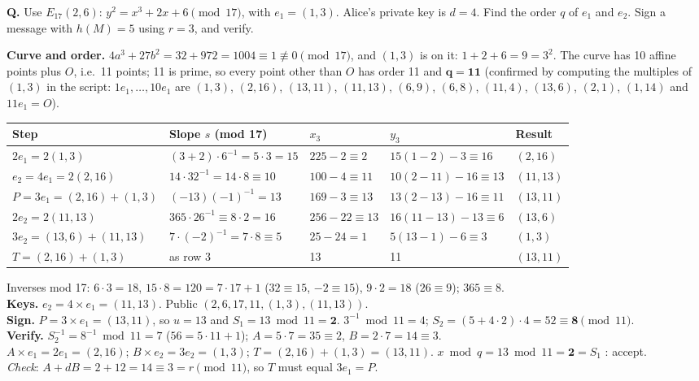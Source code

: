 \begin{worked}
\textbf{Q.} Use $E_{17}(2, 6)$: $y^2 = x^3 + 2x + 6 \pmod{17}$, with $e_1 = (1, 3)$. Alice's private key is $d = 4$. Find the order $q$ of $e_1$ and $e_2$. Sign a message with $h(M) = 5$ using $r = 3$, and verify.

\textbf{Curve and order.} $4a^3 + 27b^2 = 32 + 972 = 1004 \equiv 1 \not\equiv 0 \pmod{17}$, and $(1, 3)$ is on it: $1 + 2 + 6 = 9 = 3^2$. The curve has 10 affine points plus $O$, i.e.\ 11 points; 11 is prime, so every point other than $O$ has order 11 and $\mathbf{q = 11}$ (confirmed by computing the multiples of $(1, 3)$ in the script: $1e_1, \dots, 10e_1$ are $(1,3)$, $(2,16)$, $(13,11)$, $(11,13)$, $(6,9)$, $(6,8)$, $(11,4)$, $(13,6)$, $(2,1)$, $(1,14)$ and $11e_1 = O$).
\begin{center}\small
\begin{tabular}{@{}lllll@{}}
\toprule
Step & Slope $s$ (mod 17) & $x_3$ & $y_3$ & Result\\
\midrule
$2e_1 = 2(1, 3)$ & $(3 + 2)\cdot 6^{-1} = 5 \cdot 3 = 15$ & $225 - 2 \equiv 2$ & $15(1 - 2) - 3 \equiv 16$ & $(2, 16)$\\
$e_2 = 4e_1 = 2(2, 16)$ & $14 \cdot 32^{-1} = 14 \cdot 8 \equiv 10$ & $100 - 4 \equiv 11$ & $10(2 - 11) - 16 \equiv 13$ & $(11, 13)$\\
$P = 3e_1 = (2,16) + (1,3)$ & $(-13)(-1)^{-1} = 13$ & $169 - 3 \equiv 13$ & $13(2 - 13) - 16 \equiv 11$ & $(13, 11)$\\
$2e_2 = 2(11, 13)$ & $365 \cdot 26^{-1} \equiv 8 \cdot 2 = 16$ & $256 - 22 \equiv 13$ & $16(11 - 13) - 13 \equiv 6$ & $(13, 6)$\\
$3e_2 = (13, 6) + (11, 13)$ & $7 \cdot (-2)^{-1} = 7 \cdot 8 \equiv 5$ & $25 - 24 = 1$ & $5(13 - 1) - 6 \equiv 3$ & $(1, 3)$\\
$T = (2, 16) + (1, 3)$ & as row 3 & 13 & 11 & $(13, 11)$\\
\bottomrule
\end{tabular}
\end{center}
Inverses mod 17: $6 \cdot 3 = 18$, $15 \cdot 8 = 120 = 7 \cdot 17 + 1$ ($32 \equiv 15$, $-2 \equiv 15$), $9 \cdot 2 = 18$ ($26 \equiv 9$); $365 \equiv 8$.\\
\textbf{Keys.} $e_2 = 4 \times e_1 = (11, 13)$. Public $(2, 6, 17, 11, (1,3), (11,13))$.\\
\textbf{Sign.} $P = 3 \times e_1 = (13, 11)$, so $u = 13$ and $S_1 = 13 \bmod 11 = \mathbf{2}$. $3^{-1} \bmod 11 = 4$; \;$S_2 = (5 + 4 \cdot 2) \cdot 4 = 52 \equiv \mathbf{8} \pmod{11}$.\\
\textbf{Verify.} $S_2^{-1} = 8^{-1} \bmod 11 = 7$ ($56 = 5 \cdot 11 + 1$); \;$A = 5 \cdot 7 = 35 \equiv 2$, \;$B = 2 \cdot 7 = 14 \equiv 3$.\\
$A \times e_1 = 2e_1 = (2, 16)$; \;$B \times e_2 = 3e_2 = (1, 3)$; \;$T = (2, 16) + (1, 3) = (13, 11)$. \;$x \bmod q = 13 \bmod 11 = \mathbf{2} = S_1$ \checkmark: accept.\\
\emph{Check}: $A + dB = 2 + 12 = 14 \equiv 3 = r \pmod{11}$, so $T$ must equal $3e_1 = P$.
\end{worked}

